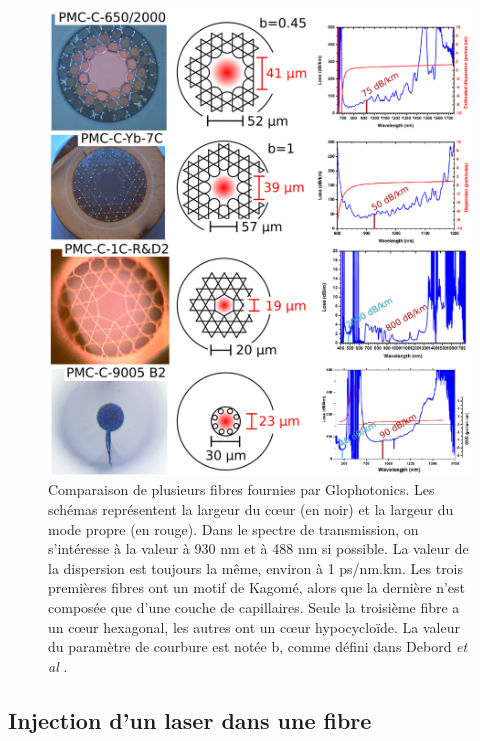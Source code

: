 \begin{figure}
\centering
\includegraphics[width=\textwidth]{./files/glofibers.svg.png}
\caption{Comparaison de plusieurs fibres fournies par Glophotonics. Les schémas représentent la largeur du cœur (en noir) et la largeur du mode propre (en rouge). Dans le spectre de transmission, on s'intéresse à la valeur à 930 nm et à 488 nm si possible. La valeur de la dispersion est toujours la même, environ à 1 ps/nm.km. Les trois premières fibres ont un motif de Kagomé, alors que la dernière n'est composée que d'une couche de capillaires. Seule la troisième fibre a un cœur hexagonal, les autres ont un cœur hypocycloïde. La valeur du paramètre de courbure est notée b, comme défini dans Debord \emph{et al} \cite{debord_hypocycloid-shaped_2013}.
\label{FIGfibercomparison}}
\end{figure}


\subsection{Injection d'un laser dans une fibre}

